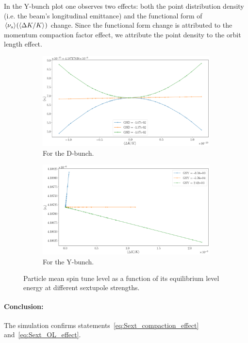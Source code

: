 In the Y-bunch plot one observes two effects: both the point distribution density (i.e. the beam's longitudinal emittance) and the functional form of $\avg{\nu_s}(\avg{\Delta K/K})$ change. Since the functional form change 
is attributed to the momentum compaction factor effect, we attribute the point density to the orbit length
effect.

\begin{figure}[h]
	\centering
	\begin{subfigure}{\linewidth}
		\includegraphics[width=\linewidth]{images/decoh_sim/propdef/stune_vs_dkok_SS_D}
		\caption{For the D-bunch.}
	\end{subfigure}
	\begin{subfigure}{\linewidth}
		\includegraphics[width=\linewidth]{images/decoh_sim/propdef/stune_vs_dkok_SS_Y}
		\caption{For the Y-bunch.}
	\end{subfigure}
	\caption{Particle mean spin tune level as a function of its equilibrium level energy at different sextupole strengths.\label{fig:ST_vs_dkok_for_sext_strenghts}}
\end{figure}

\paragraph{Conclusion:} The simulation confirms statements~\eqref{eq:Sext_compaction_effect} and~\eqref{eq:Sext_OL_effect}.

